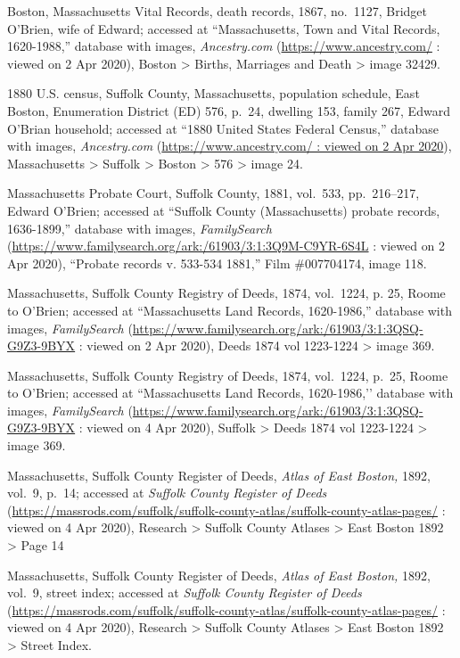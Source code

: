 \begin{thebibliography}{99}
	Boston, Massachusetts Vital Records, death records, 1867, no.\ 1127, Bridget O'Brien, wife of Edward; accessed at ``Massachusetts, Town and Vital Records, 1620-1988,'' database with images, \textit{Ancestry.com} (\url{https://www.ancestry.com/} : viewed on 2 Apr 2020), Boston > Births, Marriages and Death > image 32429.
	
	1880 U.S. census, Suffolk County, Massachusetts, population schedule, East Boston, Enumeration District (ED) 576, p.\ 24, dwelling 153, family 267, Edward O'Brian household; accessed at ``1880 United States Federal Census,'' database with images, \textit{Ancestry.com} (\url{https://www.ancestry.com/ : viewed on 2 Apr 2020}), Massachusetts > Suffolk > Boston > 576 > image 24.
	
	Massachusetts Probate Court, Suffolk County, 1881, vol.\ 533, pp.\ 216--217, Edward O'Brien; accessed at ``Suffolk County (Massachusetts) probate records, 1636-1899,'' database with images, \textit{FamilySearch} (\url{https://www.familysearch.org/ark:/61903/3:1:3Q9M-C9YR-6S4L} : viewed on 2 Apr 2020), ``Probate records v. 533-534 1881,'' Film \#007704174, image 118.
	
	Massachusetts, Suffolk County Registry of Deeds, 1874, vol.\ 1224, p. 25, Roome to O'Brien; accessed at ``Massachusetts Land Records, 1620-1986,'' database with images, \textit{FamilySearch} (\url{https://www.familysearch.org/ark:/61903/3:1:3QSQ-G9Z3-9BYX} : viewed on 2 Apr 2020), Deeds 1874 vol 1223-1224 > image 369.
	
	Massachusetts, Suffolk County Registry of Deeds, 1874, vol.\ 1224, p.\ 25, Roome to O’Brien; accessed at ``Massachusetts Land Records, 1620-1986,’’ database with images, \textit{FamilySearch} (\url{https://www.familysearch.org/ark:/61903/3:1:3QSQ-G9Z3-9BYX} : viewed on 4 Apr 2020), Suffolk > Deeds 1874 vol 1223-1224 > image 369.
	
	Massachusetts, Suffolk County Register of Deeds, \textit{Atlas of East Boston,} 1892, vol.\ 9, p.\ 14; accessed at \textit{Suffolk County Register of Deeds} (\url{https://massrods.com/suffolk/suffolk-county-atlas/suffolk-county-atlas-pages/} : viewed on 4 Apr 2020), Research > Suffolk County Atlases > East Boston 1892 > Page 14
	
	Massachusetts, Suffolk County Register of Deeds, \textit{Atlas of East Boston,} 1892, vol.\ 9, street index; accessed at \textit{Suffolk County Register of Deeds} (\url{https://massrods.com/suffolk/suffolk-county-atlas/suffolk-county-atlas-pages/} : viewed on 4 Apr 2020), Research > Suffolk County Atlases > East Boston 1892 > Street Index.
	

\end{thebibliography}
